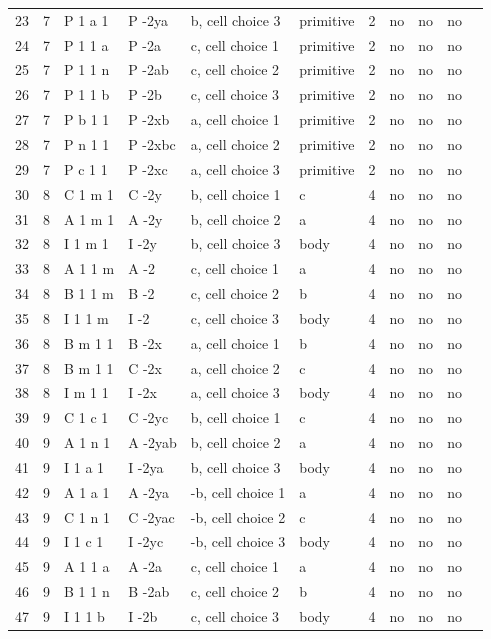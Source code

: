 \begin{center}
\begin{small}
\begin{longtable}{|l|l|l|l|l|l|l|l|l|l|l|}
23 &7 &P 1 a 1 &P -2ya &b, cell choice 3 &primitive &2 &no &no &no \\ 
24 &7 &P 1 1 a &P -2a &c, cell choice 1 &primitive &2 &no &no &no \\ 
25 &7 &P 1 1 n &P -2ab &c, cell choice 2 &primitive &2 &no &no &no \\ 
26 &7 &P 1 1 b &P -2b &c, cell choice 3 &primitive &2 &no &no &no \\ 
27 &7 &P b 1 1 &P -2xb &a, cell choice 1 &primitive &2 &no &no &no \\ 
28 &7 &P n 1 1 &P -2xbc &a, cell choice 2 &primitive &2 &no &no &no \\ 
29 &7 &P c 1 1 &P -2xc &a, cell choice 3 &primitive &2 &no &no &no \\ 
30 &8 &C 1 m 1 &C -2y &b, cell choice 1 &c &4 &no &no &no \\ 
31 &8 &A 1 m 1 &A -2y &b, cell choice 2 &a &4 &no &no &no \\ 
32 &8 &I 1 m 1 &I -2y &b, cell choice 3 &body &4 &no &no &no \\ 
33 &8 &A 1 1 m &A -2 &c, cell choice 1 &a &4 &no &no &no \\ 
34 &8 &B 1 1 m &B -2 &c, cell choice 2 &b &4 &no &no &no \\ 
35 &8 &I 1 1 m &I -2 &c, cell choice 3 &body &4 &no &no &no \\ 
36 &8 &B m 1 1 &B -2x &a, cell choice 1 &b &4 &no &no &no \\ 
37 &8 &B m 1 1 &C -2x &a, cell choice 2 &c &4 &no &no &no \\ 
38 &8 &I m 1 1 &I -2x &a, cell choice 3 &body &4 &no &no &no \\ 
39 &9 &C 1 c 1 &C -2yc &b, cell choice 1 &c &4 &no &no &no \\ 
40 &9 &A 1 n 1 &A -2yab &b, cell choice 2 &a &4 &no &no &no \\ 
41 &9 &I 1 a 1 &I -2ya &b, cell choice 3 &body &4 &no &no &no \\ 
42 &9 &A 1 a 1 &A -2ya &-b, cell choice 1 &a &4 &no &no &no \\ 
43 &9 &C 1 n 1 &C -2yac &-b, cell choice 2 &c &4 &no &no &no \\ 
44 &9 &I 1 c 1 &I -2yc &-b, cell choice 3 &body &4 &no &no &no \\ 
45 &9 &A 1 1 a &A -2a &c, cell choice 1 &a &4 &no &no &no \\ 
46 &9 &B 1 1 n &B -2ab &c, cell choice 2 &b &4 &no &no &no \\ 
47 &9 &I 1 1 b &I -2b &c, cell choice 3 &body &4 &no &no &no \\ 

\end{longtable}
\end{small}
\end{center}
